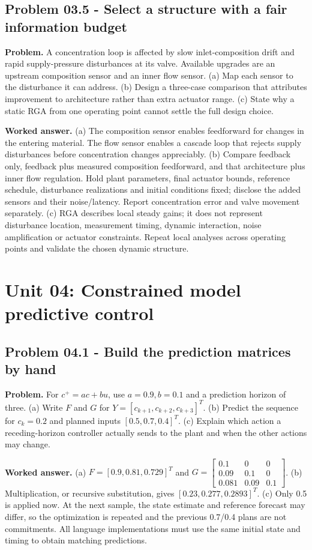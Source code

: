 \documentclass[11pt,a4paper]{article}
\begin{document}
\subsection{Problem 03.5 - Select a structure with a fair information budget}
\textbf{Problem.} A concentration loop is affected by slow inlet-composition drift and rapid supply-pressure disturbances at its valve. Available upgrades are an upstream composition sensor and an inner flow sensor. (a) Map each sensor to the disturbance it can address. (b) Design a three-case comparison that attributes improvement to architecture rather than extra actuator range. (c) State why a static RGA from one operating point cannot settle the full design choice.


\textbf{Worked answer.} (a) The composition sensor enables feedforward for changes in the entering material. The flow sensor enables a cascade loop that rejects supply disturbances before concentration changes appreciably. (b) Compare feedback only, feedback plus measured composition feedforward, and that architecture plus inner flow regulation. Hold plant parameters, final actuator bounds, reference schedule, disturbance realizations and initial conditions fixed; disclose the added sensors and their noise/latency. Report concentration error and valve movement separately. (c) RGA describes local steady gains; it does not represent disturbance location, measurement timing, dynamic interaction, noise amplification or actuator constraints. Repeat local analyses across operating points and validate the chosen dynamic structure.


\clearpage\section{Unit 04: Constrained model predictive control}
\subsection{Problem 04.1 - Build the prediction matrices by hand}
\textbf{Problem.} For $c^+=ac+bu$, use $a=0.9,b=0.1$ and a prediction horizon of three. (a) Write $F$ and $G$ for $Y=[c_{k+1},c_{k+2},c_{k+3}]^T$. (b) Predict the sequence for $c_k=0.2$ and planned inputs $[0.5,0.7,0.4]^T$. (c) Explain which action a receding-horizon controller actually sends to the plant and when the other actions may change.


\textbf{Worked answer.} (a) $F=[0.9,0.81,0.729]^T$ and $G=\begin{bmatrix}0.1&0&0\\0.09&0.1&0\\0.081&0.09&0.1\end{bmatrix}$. (b) Multiplication, or recursive substitution, gives $[0.23,0.277,0.2893]^T$. (c) Only 0.5 is applied now. At the next sample, the state estimate and reference forecast may differ, so the optimization is repeated and the previous 0.7/0.4 plans are not commitments. All language implementations must use the same initial state and timing to obtain matching predictions.
\end{document}
